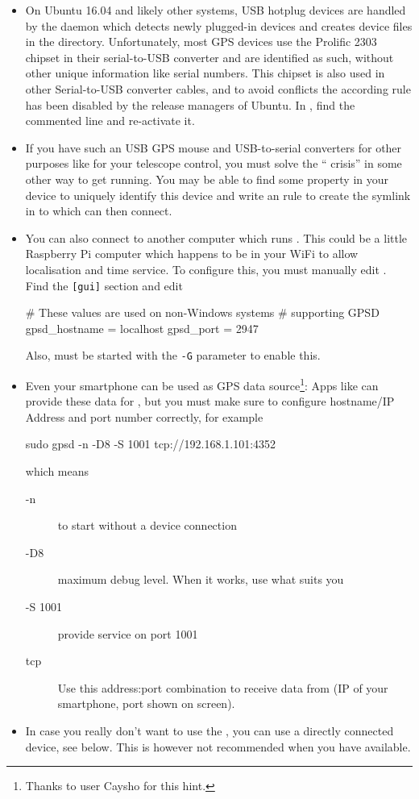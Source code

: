 \begin{itemize}
\item On Ubuntu 16.04 and likely other systems, USB hotplug devices
  are handled by the  daemon which detects newly
  plugged-in devices and creates device files in the 
  directory. Unfortunately, most GPS devices use the Prolific 2303
  chipset in their serial-to-USB converter and are identified as
  such, without other unique information like serial numbers. 
  This chipset is also used in other Serial-to-USB converter
  cables, and to avoid conflicts the according rule has been disabled
  by the release managers of Ubuntu.  In
  , find the commented line and
  re-activate it.

\item If you have such an USB GPS mouse and USB-to-serial converters
  for other purposes like for your telescope control, you must solve
  the `` crisis'' in some other way to get
   running. You may be able to find some property in
  your device to uniquely identify this device and write an
   rule to create the symlink in  to
  which  can then connect.

\item You can also connect to another computer which runs
  . This could be a little Raspberry Pi computer which
  happens to be in your WiFi to allow localisation and time service.
 To configure this, you must manually edit
  . Find the \texttt{[gui]} section and edit
\begin{configfile}
[gui]
# These values are used on non-Windows systems 
# supporting GPSD
gpsd_hostname   = localhost
gpsd_port       = 2947 
\end{configfile}
Also,  must be started with the \texttt{-G} parameter to
enable this.
\item Even your smartphone can be used as GPS data
  source\footnote{Thanks to user Caysho for this hint.}: Apps like
   can provide these data for , but
  you must make sure to configure hostname/IP Address and port number
  correctly, for example
  \begin{commands}
 sudo gpsd -n -D8 -S 1001 tcp://192.168.1.101:4352
  \end{commands}
which means
\begin{description}
\item[-n] to start without a device connection
\item[-D8] maximum debug level. When it works, use what suits you
\item[-S 1001] provide service on port 1001
\item[tcp] Use this address:port combination to receive data from (IP of
  your smartphone, port shown on  screen).
\end{description}
\item In case you really don't want to use the , you can
  use a directly connected device, see below. This is however not
  recommended when you have  available.
\end{itemize}


